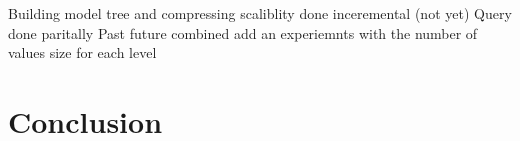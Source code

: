 \documentclass[10pt,conference,letterpaper]{IEEEtran}
\begin{document}
Building model tree and compressing
scaliblity done
inceremental (not yet)
Query done paritally
	Past 
	future
	combined
	add an experiemnts with the number of values size for each level	

\section{Conclusion}
\label{sec:conclusion}













 
\end{document}
